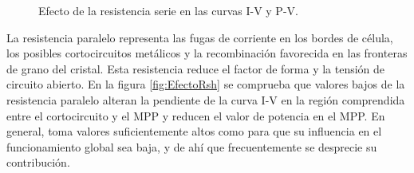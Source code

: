 %
\begin{figure}
\hfill{}\hfill{}\hfill{}

\caption{Efecto de la resistencia serie en las curvas I-V y P-V.\label{fig:EfectoRs}}



\end{figure}


La resistencia paralelo representa las fugas de corriente en los bordes
de célula, los posibles cortocircuitos metálicos y la recombinación
favorecida en las fronteras de grano del cristal. Esta resistencia
reduce el factor de forma y la tensión de circuito abierto. En la
figura \ref{fig:EfectoRsh} se comprueba que valores bajos de la resistencia
paralelo alteran la pendiente de la curva I-V en la región comprendida
entre el cortocircuito y el MPP y reducen el valor de potencia en
el MPP. En general, toma valores suficientemente altos como para que
su influencia en el funcionamiento global sea baja, y de ahí que frecuentemente
se desprecie su contribución. 

